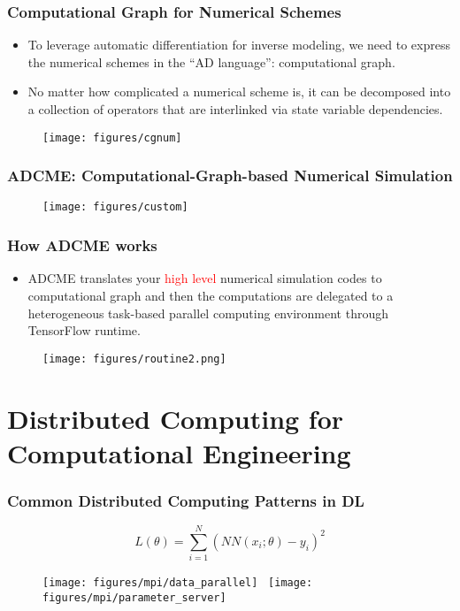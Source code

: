 \documentclass[usenames,dvipsnames]{beamer}
\begin{document}
\begin{frame}
	\frametitle{Computational Graph for Numerical Schemes}
	
	\begin{itemize}
		\item To leverage automatic differentiation for inverse modeling, we need to express the numerical schemes in the ``AD language'': computational graph. 
		\item No matter how complicated a numerical scheme is, it can be decomposed into a collection of operators that are interlinked via state variable dependencies. 
	\end{itemize}
	
	\begin{figure}[hbt]
		\texttt{[image: figures/cgnum]}
	\end{figure}
	
	
	
\end{frame}




\begin{frame}
	\frametitle{ADCME: Computational-Graph-based Numerical Simulation}
	
	\begin{figure}[hbt]
		\texttt{[image: figures/custom]}
	\end{figure}
\end{frame}

\begin{frame}
	\frametitle{How ADCME works}
	\begin{itemize}
		\item ADCME translates your \textcolor{red}{high level} numerical simulation codes to computational graph and then the computations are delegated to a heterogeneous task-based parallel computing environment through TensorFlow runtime. 
	\end{itemize}
	\begin{figure}[hbt]
		\texttt{[image: figures/routine2.png]}
	\end{figure}
\end{frame}



\section{Distributed Computing for Computational Engineering}


\begin{frame}
\frametitle{Common Distributed Computing Patterns in DL}

$$L(\theta) = \sum_{i=1}^N (NN(x_i; \theta) - y_i)^2$$

\begin{figure}
	\centering 
		\texttt{[image: figures/mpi/data\_parallel]}~
	\texttt{[image: figures/mpi/parameter\_server]}
\end{figure}

\end{frame}
\end{document}
